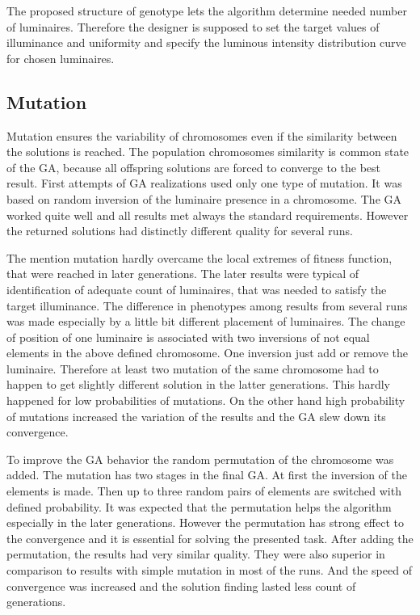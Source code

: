 The proposed structure of genotype lets the algorithm determine needed number of luminaires. Therefore the designer is supposed to set the target values of illuminance and uniformity and specify the luminous intensity distribution curve for chosen luminaires.

\subsection{Mutation}
Mutation ensures the variability of chromosomes even if the similarity between the solutions is reached. The population chromosomes similarity is common state of the GA, because all offspring solutions are forced to converge to the best result. First attempts of GA realizations used only one type of mutation. It was based on random inversion of the luminaire presence in a chromosome. The GA worked quite well and all results met always the standard requirements. However the returned solutions had distinctly different quality for several runs.

The mention mutation hardly overcame the local extremes of fitness function, that were reached in later generations. The later results were typical of identification of adequate count of luminaires, that was needed to satisfy the target illuminance. The difference in phenotypes among results from several runs was made especially by a little bit different placement of luminaires. The change of position of one luminaire is associated with two inversions of not equal elements in the above defined chromosome. One inversion just add or remove the luminaire. Therefore at least two mutation of the same chromosome had to happen to get slightly different solution in the latter generations. This hardly happened for low probabilities of mutations. On the other hand high probability of mutations increased the variation of the results and the GA slew down its convergence.

To improve the GA behavior the random permutation of the chromosome was added. The mutation has two stages in the final GA. At first the inversion of the elements is made. Then up to three random pairs of elements are switched with defined probability. It was expected that the permutation helps the algorithm especially in the later generations. However the permutation has strong effect to the convergence and it is essential for solving the presented task. After adding the permutation, the results had very similar quality. They were also superior in comparison to results with simple mutation in most of the runs. And the speed of convergence was increased and the solution finding lasted less count of generations.
